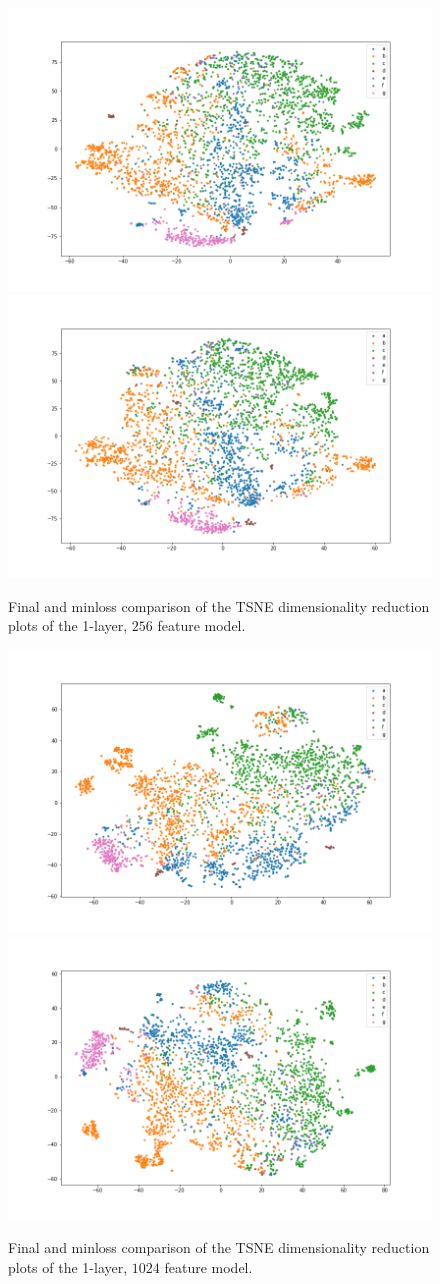 \begin{figure}[!ht]
  \includegraphics[width=0.49\linewidth]{latex/imgs/tsne_1_layer_with_schedule_256_final.png}
  \includegraphics[width=0.49\linewidth]{latex/imgs/tsne_1_layer_with_schedule_256_minloss.png}
  \caption{Final and minloss comparison of the TSNE dimensionality reduction plots of the 1-layer, $256$ feature model.}
\end{figure}
\begin{figure}[!ht]
  \includegraphics[width=0.49\linewidth]{latex/imgs/tsne_1_layer_with_schedule_1024_final.png}
  \includegraphics[width=0.49\linewidth]{latex/imgs/tsne_1_layer_with_schedule_1024_minloss.png}
  \caption{Final and minloss comparison of the TSNE dimensionality reduction plots of the 1-layer, $1024$ feature model.}
\end{figure}
